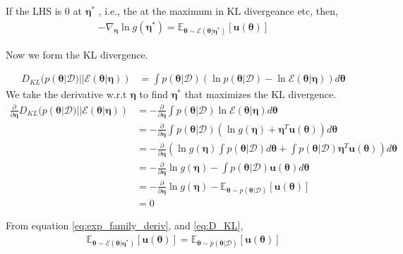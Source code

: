 \documentclass[a4]{article}
\begin{document}
If the LHS is 0 at $\bm{\eta}^*$ , i.e., the at the maximum in KL divergeance etc, then,
\begin{equation}
\begin{aligned}
- \nabla_{\bm{\eta}}\ln g(\bm{\eta}^*) = \mathbb{E}_{\bm{\theta} \sim \mathcal{E}(\bm{\theta}|\bm{\eta}^*)} [\bm{u}(\bm{\theta})]
\label{eq:exp_family_deriv}
\end{aligned}
\end{equation}

Now we form the KL divergence.

\begin{equation}
\begin{aligned}
D_{KL}(p\left(\bm{\theta}|\mathcal{D})||\mathcal{E}(\bm{\theta}|\bm{\eta})\right) &=
\int p\left(\bm{\theta}|\mathcal{D}\right)
\left( \ln p\left(\bm{\theta}|\mathcal{D}\right) - \ln \mathcal{E}(\bm{\theta}|\bm{\eta})\right)d\bm{\theta}
\end{aligned}
\end{equation}
We take the derivative w.r.t $\bm{\eta}$ to find $\bm{\eta}^*$ that maximizes the KL divergence.
\begin{equation}
\begin{aligned}
\frac{\partial}{\partial\bm{\eta}}D_{KL}(p\left(\bm{\theta}|\mathcal{D})||\mathcal{E}(\bm{\theta}|\bm{\eta})\right)
&= -
\frac{\partial}{\partial\bm{\eta}}
\int p\left(\bm{\theta}|\mathcal{D}\right) 
\ln \mathcal{E}\left(\bm{\theta}|\bm{\eta}\right)d\bm{\theta}\\
&= -
\frac{\partial}{\partial\bm{\eta}}
\int p\left(\bm{\theta}|\mathcal{D}\right) 
\left(\ln g(\bm{\eta}) + \bm{\eta}^T\bm{u}(\bm{\theta})\right)d\bm{\theta}\\
&= -
\frac{\partial}{\partial\bm{\eta}} \left(
\ln g(\bm{\eta}) \int p\left(\bm{\theta}|\mathcal{D}\right)d\bm{\theta}
+ \int p\left(\bm{\theta}|\mathcal{D}\right)
\bm{\eta}^T\bm{u}(\bm{\theta})\right)d\bm{\theta}\\
&= -
\frac{\partial}{\partial\bm{\eta}} \ln g(\bm{\eta})
-
\int p\left(\bm{\theta}|\mathcal{D}\right)\bm{u}(\bm{\theta})d\bm{\theta}\\
&= -
\frac{\partial}{\partial\bm{\eta}} \ln g(\bm{\eta})
-
\mathbb{E}_{\bm{\theta} \sim p\left(\bm{\theta}|\mathcal{D}\right)}[\bm{u}(\bm{\theta})]\\
&= 0\label{eq:D_KL}
\end{aligned}
\end{equation}

From equation \ref{eq:exp_family_deriv}, and \ref{eq:D_KL},
\begin{equation}
\begin{aligned}
\mathbb{E}_{\bm{\theta} \sim \mathcal{E}(\bm{\theta}|\bm{\eta}^*)} [\bm{u}(\bm{\theta})] = 
\mathbb{E}_{\bm{\theta} \sim p\left(\bm{\theta}|\mathcal{D}\right)}[\bm{u}(\bm{\theta})]\label{eq:moment_matching}
\end{aligned}
\end{equation}
\end{document}
